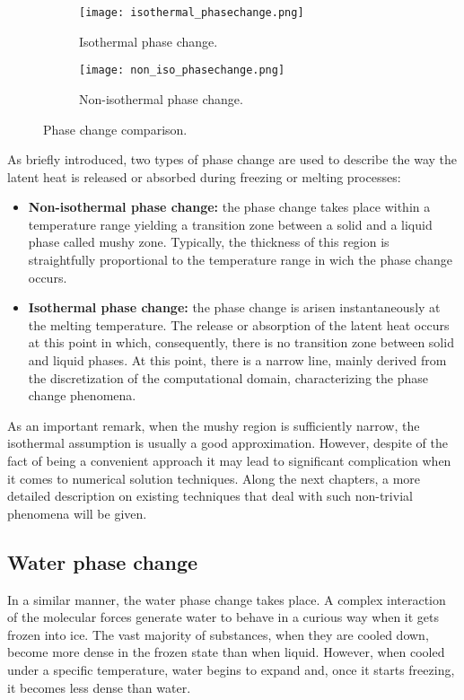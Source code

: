 \begin{figure}[h!]
	\begin{subfigure}{0.50\textwidth}
		\centering
		\texttt{[image: isothermal\_phasechange.png]}\hfill
		\caption{Isothermal phase change.} 
		\label{1.5figa}
	\end{subfigure}
	\hfill
	\begin{subfigure}{0.50\textwidth}
		\centering
		\texttt{[image: non\_iso\_phasechange.png]}	
		\caption{Non-isothermal phase change.}
		\label{1.5figb}
	\end{subfigure}
\caption{Phase change comparison.}
\label{1.5fig}
\end{figure}

\noindent As briefly introduced, two types of phase change are used to describe the way the latent heat is released or absorbed during freezing or melting processes:
\begin{itemize}
	\item \textbf{Non-isothermal phase change:} the phase change takes place within a temperature range yielding a transition zone between a solid and a liquid phase called mushy zone. Typically, the thickness of this region is straightfully proportional to the temperature range in wich the phase change occurs.
	\item \textbf{Isothermal phase change:} the phase change is arisen instantaneously at the melting temperature. The release or absorption of the latent heat occurs at this point in which, consequently, there is no transition zone between solid and liquid phases. At this point, there is a narrow line, mainly derived from the discretization of the computational domain, characterizing the phase change phenomena.
\end{itemize}

\noindent As an important remark, when the mushy region is sufficiently narrow, the isothermal assumption is usually a good approximation. However, despite of the fact of being a convenient approach it may lead to significant complication when it comes to numerical solution techniques. 
\newline
\noindent Along the next chapters, a more detailed description on existing techniques that deal with such non-trivial phenomena will be given.

\subsection{Water phase change}
\setlength{\parindent}{0.5cm} In a similar manner, the water phase change takes place. A complex interaction of the molecular forces generate water to behave in a curious way when it gets frozen into ice. The vast majority of substances, when they are cooled down, become more dense in the frozen state than when liquid. However, when cooled under a specific temperature, water begins to expand and, once it starts freezing, it becomes less dense than water. 

